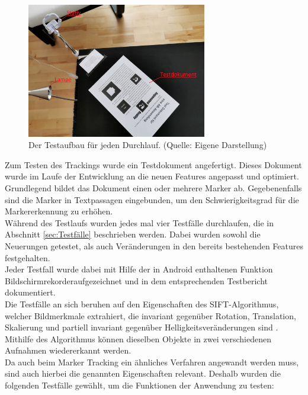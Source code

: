 \begin{figure}[h!]
\centering
\includegraphics[width=0.7\textwidth]{Abbildungen/Testaufbau.jpeg}
\caption[Testaufbau]{Der Testaufbau für jeden Durchlauf. (Quelle: Eigene Darstellung)}
\label{fig:Testaufbau}
\end{figure}
Zum Testen des Trackings wurde ein Testdokument  angefertigt. Dieses Dokument wurde im Laufe der Entwicklung an die neuen Features angepasst und optimiert. Grundlegend bildet das Dokument einen oder mehrere Marker ab. Gegebenenfalls sind die Marker in Textpassagen eingebunden, um den Schwierigkeitsgrad für die Markererkennung zu erhöhen.\\
Während des Testlaufs wurden jedes mal vier Testfälle durchlaufen, die in Abschnitt \ref{sec:Testfälle} beschrieben werden. Dabei wurden sowohl die Neuerungen getestet, als auch Veränderungen in den bereits bestehenden Features festgehalten.\\
Jeder Testfall wurde dabei mit Hilfe der in Android enthaltenen Funktion \glqq Bildschirmrekorder\grqq aufgezeichnet und in dem entsprechenden Testbericht dokumentiert.\\
Die Testfälle an sich beruhen auf den Eigenschaften des SIFT-Algorithmus, welcher Bildmerkmale extrahiert, die invariant gegenüber Rotation, Translation, Skalierung und partiell invariant gegenüber Helligkeitsveränderungen sind \citep[S. 345]{nischwitz:bildverarbeitung}. Mithilfe des Algorithmus können dieselben Objekte in zwei verschiedenen Aufnahmen wiedererkannt werden.\\
Da auch beim Marker Tracking ein ähnliches Verfahren angewandt werden muss, sind auch hierbei die genannten Eigenschaften relevant. Deshalb wurden die folgenden Testfälle gewählt, um die Funktionen der Anwendung zu testen:

